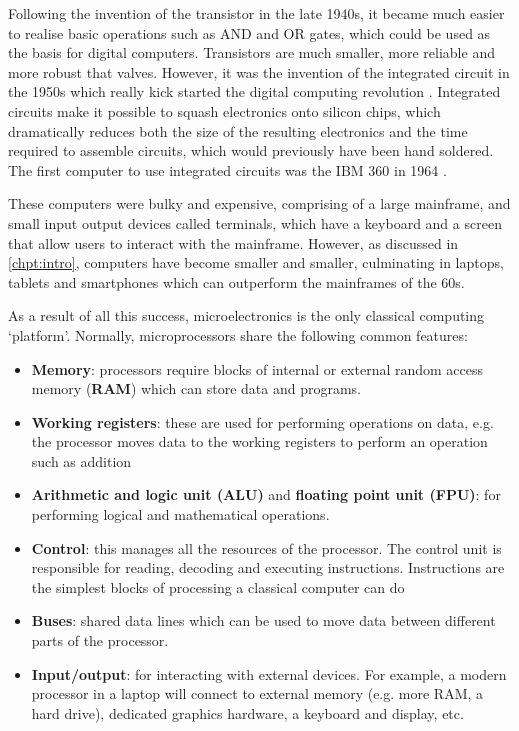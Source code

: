 Following the invention of the transistor in the late 1940s, it became much easier to realise basic operations such as AND and OR gates, which could be used as the basis for digital computers. Transistors are much smaller, more reliable and more robust that valves. However, it was the invention of the integrated circuit in the 1950s which really kick started the digital computing revolution \cite{kilby1976invention}. Integrated circuits make it possible to squash electronics onto silicon chips, which dramatically reduces both the size of the resulting electronics and the time required to assemble circuits, which would previously have been hand soldered. The first computer to use integrated circuits was the IBM 360 in 1964 \cite{ibm360record}. 

These computers were bulky and expensive, comprising of a large mainframe, and small input output devices called terminals, which have a keyboard and a screen that allow users to interact with the mainframe. However, as discussed in \autoref{chpt:intro}, computers have become smaller and smaller, culminating in laptops, tablets and smartphones which can outperform the mainframes of the 60s.

As a result of all this success, microelectronics is the only classical computing `platform'. Normally, microprocessors share the following common features:
\begin{itemize}
    \item{\textbf{Memory}: processors require blocks of internal or external random access memory (\textbf{RAM}) which can store data and programs.}
    \item{\textbf{Working registers}: these are used for performing operations on data, e.g. the processor moves data to the working registers to perform an operation such as addition}
    \item{\textbf{Arithmetic and logic unit (ALU)} and \textbf{floating point unit (FPU)}: for performing logical and mathematical operations.}
    \item{ \textbf{Control}: this manages all the resources of the processor. The control unit is responsible for reading, decoding and executing instructions. Instructions are the simplest blocks of processing a classical computer can do}
    \item{\textbf{Buses}: shared data lines which can be used to move data between different parts of the processor.}
    \item{\textbf{Input/output}: for interacting with external devices. For example, a modern processor in a laptop will connect to external memory (e.g. more RAM, a hard drive), dedicated graphics hardware, a keyboard and display, etc.}
\end{itemize}

